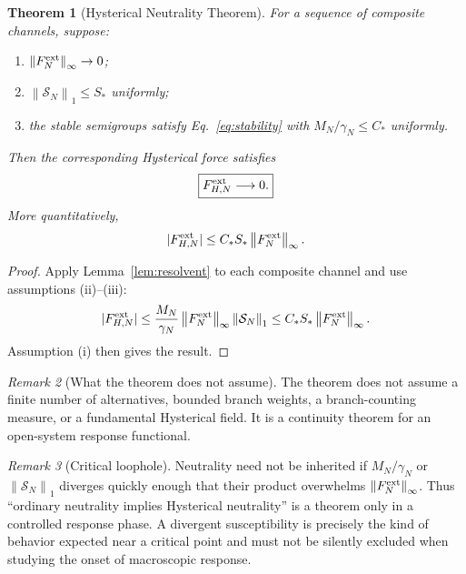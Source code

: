 \documentclass[11pt]{article}
\newtheorem{theorem}{Theorem}[section]
\theoremstyle{definition}
\theoremstyle{remark}
\newtheorem{remark}[theorem]{Remark}
\newcommand{\norm}[1]{\left\lVert #1\right\rVert}
\begin{document}
\begin{theorem}[Hysterical Neutrality Theorem]\label{thm:neutrality}
For a sequence of composite channels, suppose:
\begin{enumerate}[label=(\roman*)]
\item $\norm{F_N^{\rm ext}}_\infty\to0$;
\item $\norm{\mathcal S_N}_1\le S_*$ uniformly;
\item the stable semigroups satisfy Eq.~\eqref{eq:stability} with $M_N/\gamma_N\le C_*$ uniformly.
\end{enumerate}
Then the corresponding Hysterical force satisfies
\begin{equation}
 \boxed{F_{H,N}^{\rm ext}\longrightarrow0.}
\end{equation}
More quantitatively,
\begin{equation}
 |F_{H,N}^{\rm ext}|
 \le C_*S_*\norm{F_N^{\rm ext}}_\infty.
 \label{eq:neutralbound}
\end{equation}
\end{theorem}
\begin{proof}
Apply Lemma~\ref{lem:resolvent} to each composite channel and use assumptions (ii)--(iii):
\begin{equation}
 |F_{H,N}^{\rm ext}|
 \le \frac{M_N}{\gamma_N}\norm{F_N^{\rm ext}}_\infty\norm{\mathcal S_N}_1
 \le C_*S_*\norm{F_N^{\rm ext}}_\infty.
\end{equation}
Assumption (i) then gives the result.
\end{proof}

\begin{remark}[What the theorem does not assume]
The theorem does not assume a finite number of alternatives, bounded branch weights, a branch-counting measure, or a fundamental Hysterical field.  It is a continuity theorem for an open-system response functional.
\end{remark}

\begin{remark}[Critical loophole]
Neutrality need not be inherited if $M_N/\gamma_N$ or $\norm{\mathcal S_N}_1$ diverges quickly enough that their product overwhelms $\norm{F_N^{\rm ext}}_\infty$.  Thus ``ordinary neutrality implies Hysterical neutrality'' is a theorem only in a controlled response phase.  A divergent susceptibility is precisely the kind of behavior expected near a critical point and must not be silently excluded when studying the onset of macroscopic response.
\end{remark}
\end{document}
